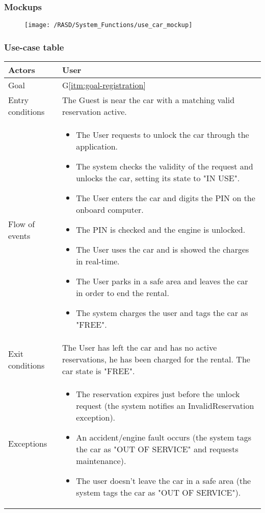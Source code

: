 \subsubsection{Mockups}
\begin{figure}[!ht]
  \centering
  \vspace{0.2cm}
  \texttt{[image: /RASD/System\_Functions/use\_car\_mockup]}\\
  \vspace{0.4cm}
  \label{fig:use_car_mockup} 
\end{figure}


\subsubsection{Use-case table}
\begin{center}
  \begin{tabular}{ l | p{10cm} }
    \hline
    Actors & User\\ \hline
    Goal & G\ref{itm:goal-registration}\\ \hline
    Entry conditions & The Guest is near the car with a matching valid reservation active. 
     \\ \hline
    Flow of events &
    \begin{itemize} %
      \item The User requests to unlock the car through the application.
      \item The system checks the validity of the request and unlocks the car, setting its state to "IN USE".
      \item The User enters the car and digits the PIN on the onboard computer.
      \item The PIN is checked and the engine is unlocked.
      \item The User uses the car and is showed the charges in real-time.
      \item The User parks in a safe area and leaves the car in order to end the rental.
      \item The system charges the user and tags the car as "FREE".
    \end{itemize} \\ \hline
    Exit conditions & The User has left the car and has no active reservations, he has been charged for the rental. The car state is "FREE". \\ \hline
  	Exceptions & 
    \begin{itemize}
      \item The reservation expires just before the unlock request (the system notifies an InvalidReservation exception).
      \item An accident/engine fault occurs (the system tags the car as "OUT OF SERVICE" and requests maintenance).
      \item The user doesn't leave the car in a safe area (the system tags the car as "OUT OF SERVICE").
    \end{itemize} \\ \hline
  \end{tabular}
\end{center}

